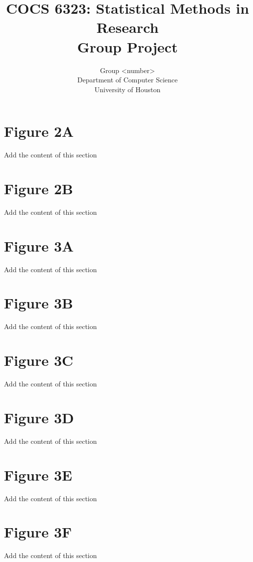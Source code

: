 \documentclass[10pt]{article}         %
\title{COCS 6323: Statistical Methods in Research \\ Group Project} %
\author{Group <number> \\
        Department of Computer Science\\
        University of Houston}         %
\begin{document}



\maketitle              %

\newpage
\tableofcontents        %
\listoftables           %
\listoffigures          %

\newpage
\section{Figure 2A}
Add the content of this section

\newpage
\section{Figure 2B}
Add the content of this section

\newpage
\section{Figure 3A}
Add the content of this section

\newpage
\section{Figure 3B}
Add the content of this section

\newpage
\section{Figure 3C}
Add the content of this section

\newpage
\section{Figure 3D}
Add the content of this section

\newpage
\section{Figure 3E}
Add the content of this section

\newpage
\section{Figure 3F}
Add the content of this section

\bigskip   %
\end{document}
